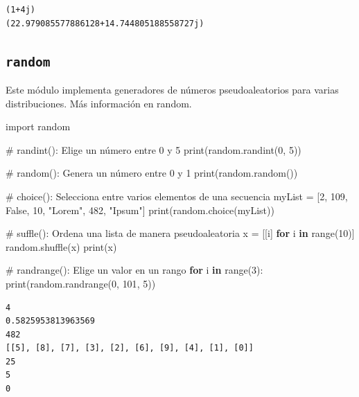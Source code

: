 \documentclass[
  spanish,
  letterpaper,
]{scrbook}
\newenvironment{Shaded}{\begin{snugshade}}{\end{snugshade}}
\newcommand{\BuiltInTok}[1]{\textcolor[rgb]{0.00,0.23,0.31}{#1}}
\newcommand{\CommentTok}[1]{\textcolor[rgb]{0.37,0.37,0.37}{#1}}
\newcommand{\ControlFlowTok}[1]{\textcolor[rgb]{0.00,0.23,0.31}{\textbf{#1}}}
\newcommand{\DecValTok}[1]{\textcolor[rgb]{0.68,0.00,0.00}{#1}}
\newcommand{\ImportTok}[1]{\textcolor[rgb]{0.00,0.46,0.62}{#1}}
\newcommand{\KeywordTok}[1]{\textcolor[rgb]{0.00,0.23,0.31}{\textbf{#1}}}
\newcommand{\NormalTok}[1]{\textcolor[rgb]{0.00,0.23,0.31}{#1}}
\newcommand{\OperatorTok}[1]{\textcolor[rgb]{0.37,0.37,0.37}{#1}}
\newcommand{\StringTok}[1]{\textcolor[rgb]{0.13,0.47,0.30}{#1}}
\newcommand{\VariableTok}[1]{\textcolor[rgb]{0.07,0.07,0.07}{#1}}
\theoremstyle{definition}
\theoremstyle{remark}
\begin{document}
\begin{verbatim}
(1+4j)
(22.979085577886128+14.744805188558727j)
\end{verbatim}

\subsection{\texorpdfstring{\texttt{random}}{random}}\label{random}

Este módulo implementa generadores de números pseudoaleatorios para
varias distribuciones. Más información en random.

\begin{Shaded}
\begin{Highlighting}[]
\ImportTok{import}\NormalTok{ random}

\CommentTok{\# randint(): Elige un número entre 0 y 5}
\BuiltInTok{print}\NormalTok{(random.randint(}\DecValTok{0}\NormalTok{, }\DecValTok{5}\NormalTok{))}

\CommentTok{\# random(): Genera un número entre 0 y 1}
\BuiltInTok{print}\NormalTok{(random.random())}

\CommentTok{\# choice(): Selecciona entre varios elementos de una secuencia}
\NormalTok{myList }\OperatorTok{=}\NormalTok{ [}\DecValTok{2}\NormalTok{, }\DecValTok{109}\NormalTok{, }\VariableTok{False}\NormalTok{, }\DecValTok{10}\NormalTok{, }\StringTok{"Lorem"}\NormalTok{, }\DecValTok{482}\NormalTok{, }\StringTok{"Ipsum"}\NormalTok{]}
\BuiltInTok{print}\NormalTok{(random.choice(myList))}

\CommentTok{\# suffle(): Ordena una lista de manera pseudoaleatoria}
\NormalTok{x }\OperatorTok{=}\NormalTok{ [[i] }\ControlFlowTok{for}\NormalTok{ i }\KeywordTok{in} \BuiltInTok{range}\NormalTok{(}\DecValTok{10}\NormalTok{)]}
\NormalTok{random.shuffle(x)}
\BuiltInTok{print}\NormalTok{(x)}

\CommentTok{\# randrange(): Elige un valor en un rango}
\ControlFlowTok{for}\NormalTok{ i }\KeywordTok{in} \BuiltInTok{range}\NormalTok{(}\DecValTok{3}\NormalTok{):}
    \BuiltInTok{print}\NormalTok{(random.randrange(}\DecValTok{0}\NormalTok{, }\DecValTok{101}\NormalTok{, }\DecValTok{5}\NormalTok{))}
\end{Highlighting}
\end{Shaded}

\begin{verbatim}
4
0.5825953813963569
482
[[5], [8], [7], [3], [2], [6], [9], [4], [1], [0]]
25
5
0
\end{verbatim}
\end{document}
